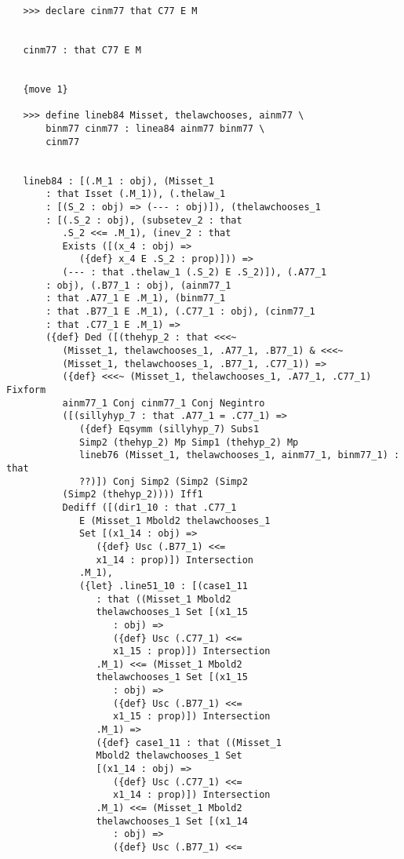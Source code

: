 \documentclass[12pt]{article}
\begin{document}
\begin{verbatim}
   >>> declare cinm77 that C77 E M


   cinm77 : that C77 E M


   {move 1}

   >>> define lineb84 Misset, thelawchooses, ainm77 \
       binm77 cinm77 : linea84 ainm77 binm77 \
       cinm77


   lineb84 : [(.M_1 : obj), (Misset_1 
       : that Isset (.M_1)), (.thelaw_1 
       : [(S_2 : obj) => (--- : obj)]), (thelawchooses_1 
       : [(.S_2 : obj), (subsetev_2 : that 
          .S_2 <<= .M_1), (inev_2 : that 
          Exists ([(x_4 : obj) => 
             ({def} x_4 E .S_2 : prop)])) => 
          (--- : that .thelaw_1 (.S_2) E .S_2)]), (.A77_1 
       : obj), (.B77_1 : obj), (ainm77_1 
       : that .A77_1 E .M_1), (binm77_1 
       : that .B77_1 E .M_1), (.C77_1 : obj), (cinm77_1 
       : that .C77_1 E .M_1) => 
       ({def} Ded ([(thehyp_2 : that <<<~ 
          (Misset_1, thelawchooses_1, .A77_1, .B77_1) & <<<~ 
          (Misset_1, thelawchooses_1, .B77_1, .C77_1)) => 
          ({def} <<<~ (Misset_1, thelawchooses_1, .A77_1, .C77_1) Fixform 
          ainm77_1 Conj cinm77_1 Conj Negintro 
          ([(sillyhyp_7 : that .A77_1 = .C77_1) => 
             ({def} Eqsymm (sillyhyp_7) Subs1 
             Simp2 (thehyp_2) Mp Simp1 (thehyp_2) Mp 
             lineb76 (Misset_1, thelawchooses_1, ainm77_1, binm77_1) : that 
             ??)]) Conj Simp2 (Simp2 (Simp2 
          (Simp2 (thehyp_2)))) Iff1 
          Dediff ([(dir1_10 : that .C77_1 
             E (Misset_1 Mbold2 thelawchooses_1 
             Set [(x1_14 : obj) => 
                ({def} Usc (.B77_1) <<= 
                x1_14 : prop)]) Intersection 
             .M_1), 
             ({let} .line51_10 : [(case1_11 
                : that ((Misset_1 Mbold2 
                thelawchooses_1 Set [(x1_15 
                   : obj) => 
                   ({def} Usc (.C77_1) <<= 
                   x1_15 : prop)]) Intersection 
                .M_1) <<= (Misset_1 Mbold2 
                thelawchooses_1 Set [(x1_15 
                   : obj) => 
                   ({def} Usc (.B77_1) <<= 
                   x1_15 : prop)]) Intersection 
                .M_1) => 
                ({def} case1_11 : that ((Misset_1 
                Mbold2 thelawchooses_1 Set 
                [(x1_14 : obj) => 
                   ({def} Usc (.C77_1) <<= 
                   x1_14 : prop)]) Intersection 
                .M_1) <<= (Misset_1 Mbold2 
                thelawchooses_1 Set [(x1_14 
                   : obj) => 
                   ({def} Usc (.B77_1) <<= 

\end{verbatim}
\end{document}
